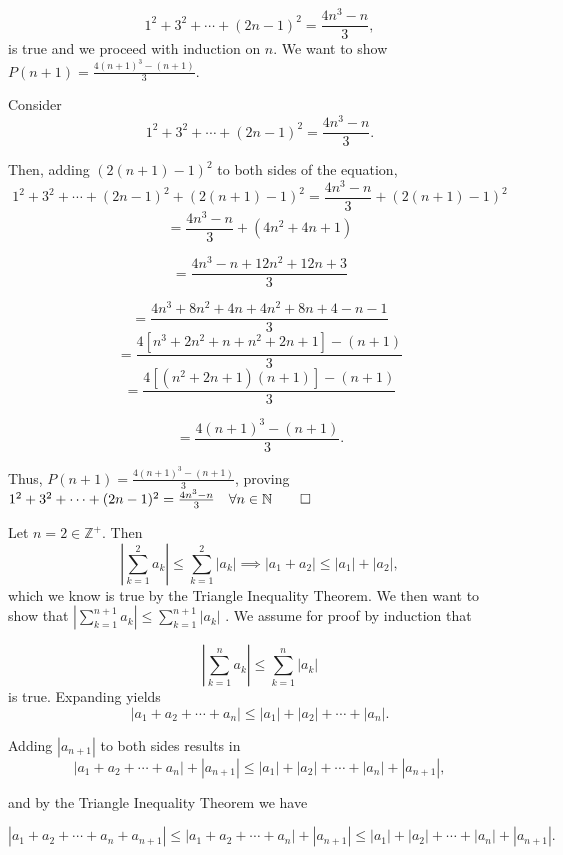 \documentclass{report}
\begin{document}
$$ 1^{2}+3^{2}+\cdots+(2 n-1)^{2}=\frac{4 n^{3}-n}{3}, $$
is true and we proceed with induction on $n$. We want to show $P(n+1) = \frac{4 (n+1)^{3}-(n+1)}{3}$.

Consider
$$
1^{2}+3^{2}+\cdots+(2 n-1)^{2} =\frac{4 n^{3}-n}{3}.$$

Then, adding $(2 (n+1)-1)^{2}$ to both sides of the equation,
$$ 
1^{2}+3^{2}+\cdots+(2 n-1)^{2} +(2 (n+1)-1)^{2}=\frac{4 n^{3}-n}{3} + (2 (n+1)-1)^{2} 
$$  
$$ 
=\frac{4 n^{3}-n}{3} + (4n^2+4n +1) 
$$  

$$ 
=\frac{4 n^{3}-n+12n^2+12n +3}{3}
$$  

$$ 
=\frac{4 n^{3} + 8n^2 + 4n + 4n^2 + 8n + 4 -n -1}{3}
$$  
$$ 
=\frac{4 [n^{3} + 2n^2 + n + n^2 + 2n + 1] -(n +1)}{3}
$$  
$$ 
=\frac{4 [(n^{2} + 2n + 1)(n+1)] -(n+1)}{3}
$$  

$$ 
=\frac{4 (n+1)^3 -(n+1)}{3}.
$$  

Thus, $P(n+1) = \frac{4 (n+1)^{3}-(n+1)}{3}$, proving $1^{2}+3^{2}+\cdots+(2 n-1)^{2}=\frac{4 n^{3}-n}{3} \quad \forall n \in \mathbb{N} \qed$  

\bigskip
{}

\sol
Let $n=2 \in \mathbb{Z}^{+}$. Then 
$$
\left|\sum_{k=1}^{2} a_{k}\right| \leq \sum_{k=1}^{2}\left|a_{k}\right| \implies
\left|a_1 + a_2\right| \leq \left| a_1\right| + \left| a_2\right|,$$ which we know is true by the Triangle Inequality Theorem. We then want to show that $\left|\sum_{k=1}^{n+1} a_{k}\right| \leq \sum_{k=1}^{n+1}\left|a_{k}\right|$
.
We assume for proof by induction that

$$
\left|\sum_{k=1}^{n} a_{k}\right| \leq \sum_{k=1}^{n}\left|a_{k}\right|$$ is true.
Expanding yields
$$                                                                       
\left|a_1 + a_2 + \cdots + a_n\right| \leq \left|a_{1}\right| + \left|a_{2}\right|
+ \cdots +  \left|a_{n}\right|.$$

Adding $\left|a_{n+1}\right|$ to both sides results in
$$
\left|a_1 + a_2 + \cdots + a_n\right| + \left|a_{n+1}\right|  \leq \left|a_{1}\right| + \left|a_{2}\right|
+ \cdots +  \left|a_{n}\right|  + \left|a_{n+1}\right|,$$

and by the Triangle Inequality Theorem we have

$$
\left|a_1 + a_2 + \cdots + a_n + a_{n+1}\right|  \leq
\left|a_1 + a_2 + \cdots + a_n\right| + \left|a_{n+1}\right|  \leq \left|a_{1}\right| + \left|a_{2}\right|
+ \cdots +  \left|a_{n}\right|  + \left|a_{n+1}\right|.$$
\end{document}
